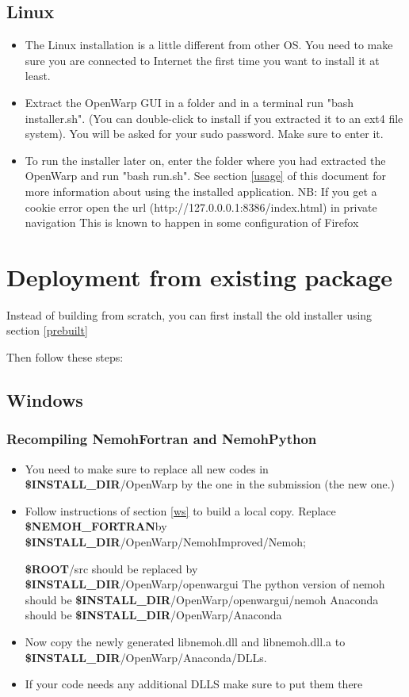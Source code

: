 \documentclass[12pt]{article}
\newcommand{\ROOT}{{\textbf{\$ROOT}}}
\newcommand{\NEMOHFORTRAN}{{\textbf{\$NEMOH{\_}FORTRAN}}}
\newcommand{\INSTALLDIR}{{\textbf{\$INSTALL{\_}DIR}}}
\begin{document}
\subsection{Linux}
 \label{prebuilt-linux}
\begin{itemize}
	\item The Linux installation is a little different from other OS. You need to make sure you are connected to Internet the first time you want to install it at least.
\item Extract the OpenWarp GUI in a folder and in a terminal run "bash installer.sh". (You can double-click to install if you extracted it to an ext4 file system). You will be asked for your sudo password. Make sure to enter it.
\item To run the installer later on, enter the folder where you had extracted the OpenWarp and run "bash run.sh". See section \ref{usage} of this document for more information about using the installed application.
NB:
If you get a cookie error open the url (http://127.0.0.0.1:8386/index.html) in private navigation This is known to happen in some configuration of Firefox
\end{itemize}




\section{Deployment from existing package }

Instead of building from scratch, you can first install the old installer using section \ref{prebuilt}

Then follow these steps:

\subsection{Windows}

\subsubsection{Recompiling NemohFortran and NemohPython}
\begin{itemize}
	\item You need to make sure to replace all new codes in \INSTALLDIR/OpenWarp by the one in the submission (the new one.)
 \item Follow instructions of section \ref{ws} to build a local copy.
  Replace \NEMOHFORTRAN by \INSTALLDIR/OpenWarp/NemohImproved/Nemoh;
  
\ROOT/src should be replaced by \INSTALLDIR/OpenWarp/openwargui
The python version of nemoh should be \INSTALLDIR/OpenWarp/openwargui/nemoh Anaconda should be \INSTALLDIR/OpenWarp/Anaconda
\item  Now copy the newly generated libnemoh.dll and libnemoh.dll.a to \INSTALLDIR/OpenWarp/Anaconda/DLLs. 

\item If your code needs any additional DLLS make sure to put them there
\end{itemize}
\end{document}
